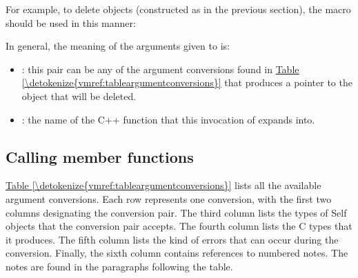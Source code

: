 \documentclass[letterpaper,10pt,english]{sphinxmanual}
\begin{document}
\begin{sphinxVerbatim}[commandchars=\\\{\}]
 
\end{sphinxVerbatim}

For example, to delete  objects (constructed as in the previous section), the
 macro should be used in this manner:

\begin{sphinxVerbatim}[commandchars=\\\{\}]
  
\end{sphinxVerbatim}

In general, the meaning of the arguments given to  is:
\begin{itemize}
\item {} 
: this pair can be any of the argument conversions found in \hyperref[\detokenize{vmref:tableargumentconversions}]{Table \ref{\detokenize{vmref:tableargumentconversions}}}
that produces a pointer to the object that will be deleted.

\item {} 
: the name of the C++ function that this invocation of  expands into.

\end{itemize}


\subsection{Calling member functions}
\label{\detokenize{vmref:calling-member-functions}}
\hyperref[\detokenize{vmref:tableargumentconversions}]{Table \ref{\detokenize{vmref:tableargumentconversions}}} lists all the available argument conversions. Each row represents one conversion, with the
first two columns designating the conversion pair. The third column lists the types of Self objects
that the conversion pair accepts. The fourth column lists the C types that it produces. The fifth column
lists the kind of errors that can occur during the conversion. Finally, the sixth column contains
references to numbered notes. The notes are found in the paragraphs following the table.
\end{document}
